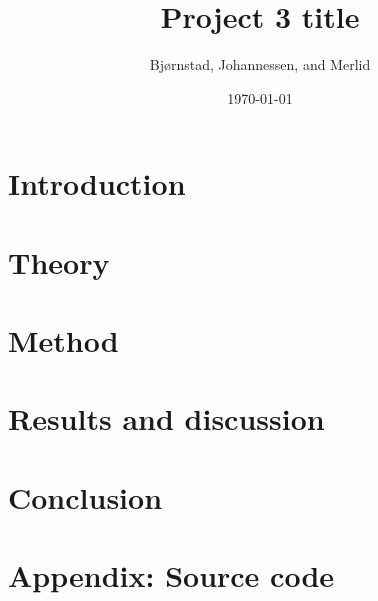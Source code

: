 \documentclass[aps,rmp,reprint,amsmath,amssymb,twocolumn,floatfix]{revtex4-1}
\begin{document}
\title{Project 3 title}

\author{Bjørnstad, Johannessen, and Merlid}
\date{\today}


\begin{abstract}

\end{abstract}
\maketitle

\tableofcontents

\section{Introduction}
\label{sec:introduction}

\section{Theory}


\section{Method}


\section{Results and discussion}


%

\section{Conclusion}


\clearpage
{} %


\clearpage
\appendix
\section{Appendix: Source code}
\label{appendix}

\clearpage
\end{document}

